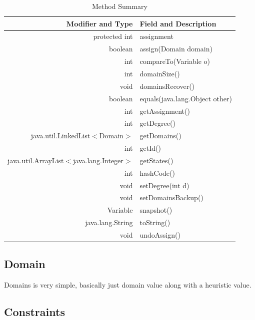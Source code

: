 \documentclass{article}
\begin{document}
\begin{table}[h]
\begin{center}
  \begin{tabular}{| r | l|  }
    \hline
    Modifier and Type & Field and Description \\ \hline
    protected int &	assignment                          \\ \hline
  boolean	&assign(Domain domain)                     \\ \hline
int&	compareTo(Variable o)                          \\ \hline
int	&domainSize()                                    \\ \hline
void&	domainsRecover()                               \\ \hline
boolean&	equals(java.lang.Object other)             \\ \hline
int	&getAssignment()                                 \\ \hline
int	&getDegree()                                     \\ \hline
java.util.LinkedList$<$Domain$>$	&getDomains()          \\ \hline
int&	getId()                                        \\ \hline
java.util.ArrayList$<$java.lang.Integer$>$&	getStates()  \\ \hline
int&	hashCode()                                     \\ \hline
void	&setDegree(int d)                              \\ \hline
void	&setDomainsBackup()                            \\ \hline
Variable	&snapshot()                                \\ \hline
java.lang.String&	toString()                         \\ \hline
void	&undoAssign()                                  \\ \hline
    \hline
  \end{tabular}
\caption{Method Summary}
\end{center}
\end{table}


\subsection{Domain}
Domains is very simple, basically just domain value along with a heuristic value.


\clearpage
\subsection{Constraints}
\end{document}
